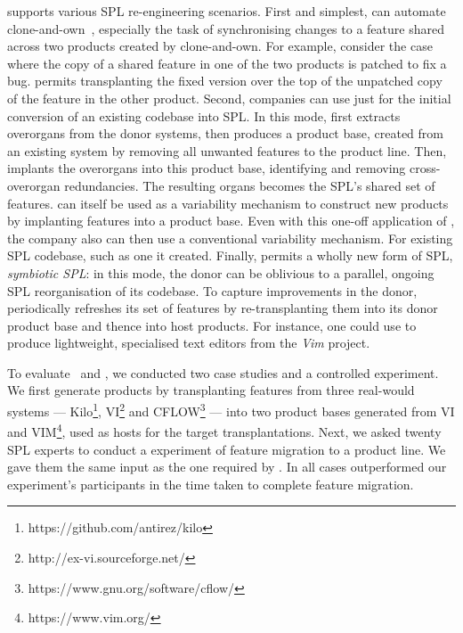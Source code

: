 \autoscalpel supports various SPL re-engineering scenarios. First and simplest, \autoscalpel can automate clone-and-own~\cite{Dubinsky2013, Fischer2015}, especially the task of synchronising changes to a feature shared across two products created by clone-and-own. For example, consider the case where the copy of a shared feature in one of the two products is patched to fix a bug. \autoscalpel permits transplanting the fixed version over the top of the unpatched copy of the feature in the other product. Second, companies can use \autoscalpel just for the initial conversion of an existing codebase into SPL. In this mode, \autoscalpel first extracts overorgans from the donor systems, then produces a product base, created from an existing system by removing all unwanted features to the product line. Then, implants the overorgans into this product base, identifying and removing cross-overorgan redundancies. The resulting organs becomes the SPL's shared set of features. \autoscalpel can itself be used as a variability mechanism to construct new products by implanting features into a product base. Even with this one-off application of \autoscalpel, the company also can then use a conventional variability mechanism. For existing SPL codebase, such as one it created. Finally, \autoscalpel permits a wholly new form of SPL, \emph{symbiotic SPL}:  in this mode, the donor can be oblivious to a parallel, ongoing SPL reorganisation of its codebase. To capture improvements in the donor, \autoscalpel periodically refreshes its set of features by re-transplanting them into its donor product base and thence into host products. For instance, one could use \autoscalpel to produce lightweight, specialised text editors from the \emph{Vim} project.      

To evaluate \FOUNDRY~and \autoscalpel, we conducted two case studies and a controlled experiment. We first generate products by transplanting features from three real-would systems ---  Kilo\footnote{https://github.com/antirez/kilo}, VI\footnote{http://ex-vi.sourceforge.net/} and CFLOW\footnote{https://www.gnu.org/software/cflow/} --- into two product bases generated from VI and VIM\footnote{https://www.vim.org/}, used as hosts for the target transplantations. Next, we asked twenty SPL experts to conduct a experiment of feature migration to a product line. We gave them the same input as the one required by \autoscalpel. In all cases \autoscalpel outperformed our experiment's participants in the time taken to complete feature migration.

